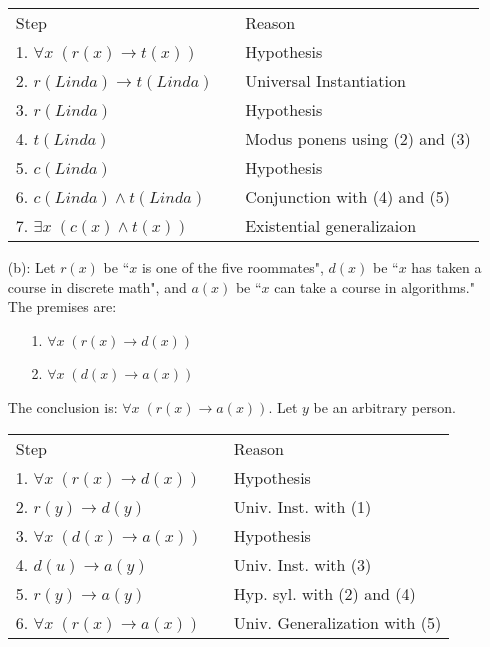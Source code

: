 \documentclass[12pt,addpoints]{exam}
\begin{document}
\begin{questions}
\begin{solution}
\begin{itemize}[itemsep=0pt,parsep=0pt,topsep=0pt,partopsep=0pt]
    \smallskip
    \begin{tabular}{lll}
        Step        & \hspace{0.2in} & Reason \\
        1. $\forall x\; (r(x) \rightarrow t(x))$    &   & Hypothesis \\
        2. $r(Linda) \rightarrow t(Linda)$          &   & Universal Instantiation \\
        3. $r(Linda)$                               &   & Hypothesis \\
        4. $t(Linda)$                               &   & Modus ponens using (2) and (3) \\
        5. $c(Linda)$                               &   & Hypothesis \\
        6. $c(Linda) \wedge t(Linda)$               &   & Conjunction with (4) and (5) \\
        7. $\exists x\; (c(x) \wedge t(x))$         &   & Existential generalizaion \\
    \end{tabular}

    \item[(b):] Let $r(x)$ be ``$x$ is one of the five roommates", $d(x)$ be ``$x$ has taken a course in discrete math", and $a(x)$ be ``$x$ can take a course in algorithms." The premises are:
    \begin{itemize}[itemsep=0pt,parsep=0pt,topsep=0pt,partopsep=0pt]
        \item[1.] $\forall x\;(r(x) \rightarrow d(x))$
        \item[2.] $\forall x\;(d(x) \rightarrow a(x))$
    \end{itemize}
    The conclusion is: $\forall x\;(r(x) \rightarrow a(x))$.  Let $y$ be an arbitrary person.

    \smallskip
    \begin{tabular}{lll}
        Step        & \hspace{0.2in} & Reason \\
        1. $\forall x\;(r(x) \rightarrow d(x))$     &   & Hypothesis \\
        2. $r(y) \rightarrow d(y)$                  & & Univ. Inst. with (1) \\
        3. $\forall x\; (d(x) \rightarrow a(x))$    &   & Hypothesis \\
        4. $d(u) \rightarrow a(y)$                  &   & Univ. Inst. with (3) \\
        5. $r(y) \rightarrow a(y)$                  &   & Hyp. syl. with (2) and (4) \\
        6. $\forall x\;(r(x) \rightarrow a(x))$     &   & Univ. Generalization with (5) \\
    \end{tabular}
    \end{itemize}
\end{solution}



\end{questions}
\end{document}

